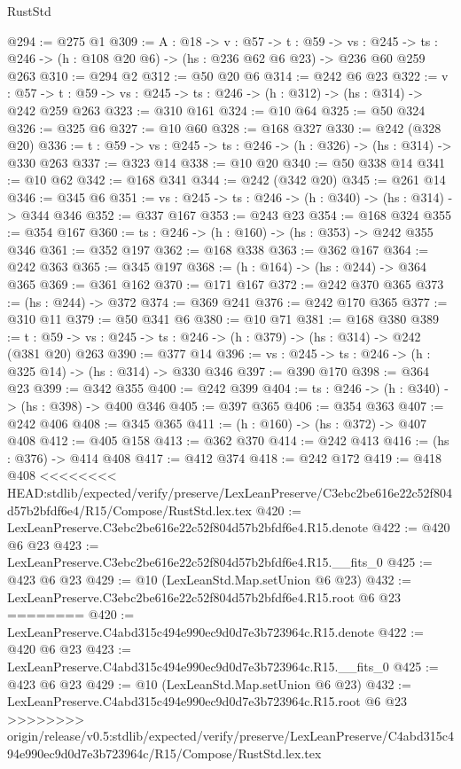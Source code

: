 \begin{lexlean}{RustStd}
\begin{coremodule}
{\begin{coremodule}
@294 := @275 @1
@309 := {A : @18} ->
  {v : @57} ->
  {t : @59} ->
  {vs : @245} -> {ts : @246} -> (h : @108 @20 @6) -> (hs : @236 @62 @6 @23) -> @236 @60 @259 @263
@310 := @294 @2
@312 := @50 @20 @6
@314 := @242 @6 @23
@322 := {v : @57} ->
  {t : @59} -> {vs : @245} -> {ts : @246} -> (h : @312) -> (hs : @314) -> @242 @259 @263
@323 := @310 @161
@324 := @10 @64
@325 := @50 @324
@326 := @325 @6
@327 := @10 @60
@328 := @168 @327
@330 := @242 (@328 @20)
@336 := {t : @59} -> {vs : @245} -> {ts : @246} -> (h : @326) -> (hs : @314) -> @330 @263
@337 := @323 @14
@338 := @10 @20
@340 := @50 @338 @14
@341 := @10 @62
@342 := @168 @341
@344 := @242 (@342 @20)
@345 := @261 @14
@346 := @345 @6
@351 := {vs : @245} -> {ts : @246} -> (h : @340) -> (hs : @314) -> @344 @346
@352 := @337 @167
@353 := @243 @23
@354 := @168 @324
@355 := @354 @167
@360 := {ts : @246} -> (h : @160) -> (hs : @353) -> @242 @355 @346
@361 := @352 @197
@362 := @168 @338
@363 := @362 @167
@364 := @242 @363
@365 := @345 @197
@368 := (h : @164) -> (hs : @244) -> @364 @365
@369 := @361 @162
@370 := @171 @167
@372 := @242 @370 @365
@373 := (hs : @244) -> @372
@374 := @369 @241
@376 := @242 @170 @365
@377 := @310 @11
@379 := @50 @341 @6
@380 := @10 @71
@381 := @168 @380
@389 := {t : @59} -> {vs : @245} -> {ts : @246} -> (h : @379) -> (hs : @314) -> @242 (@381 @20) @263
@390 := @377 @14
@396 := {vs : @245} -> {ts : @246} -> (h : @325 @14) -> (hs : @314) -> @330 @346
@397 := @390 @170
@398 := @364 @23
@399 := @342 @355
@400 := @242 @399
@404 := {ts : @246} -> (h : @340) -> (hs : @398) -> @400 @346
@405 := @397 @365
@406 := @354 @363
@407 := @242 @406
@408 := @345 @365
@411 := (h : @160) -> (hs : @372) -> @407 @408
@412 := @405 @158
@413 := @362 @370
@414 := @242 @413
@416 := (hs : @376) -> @414 @408
@417 := @412 @374
@418 := @242 @172
@419 := @418 @408
<<<<<<<< HEAD:stdlib/expected/verify/preserve/LexLeanPreserve/C3ebc2be616e22c52f804d57b2bfdf6e4/R15/Compose/RustStd.lex.tex
@420 := LexLeanPreserve.C3ebc2be616e22c52f804d57b2bfdf6e4.R15.denote
@422 := @420 @6 @23
@423 := LexLeanPreserve.C3ebc2be616e22c52f804d57b2bfdf6e4.R15.__fits_0
@425 := @423 @6 @23
@429 := @10 (LexLeanStd.Map.setUnion @6 @23)
@432 := LexLeanPreserve.C3ebc2be616e22c52f804d57b2bfdf6e4.R15.root @6 @23
========
@420 := LexLeanPreserve.C4abd315c494e990ec9d0d7e3b723964c.R15.denote
@422 := @420 @6 @23
@423 := LexLeanPreserve.C4abd315c494e990ec9d0d7e3b723964c.R15.__fits_0
@425 := @423 @6 @23
@429 := @10 (LexLeanStd.Map.setUnion @6 @23)
@432 := LexLeanPreserve.C4abd315c494e990ec9d0d7e3b723964c.R15.root @6 @23
>>>>>>>> origin/release/v0.5:stdlib/expected/verify/preserve/LexLeanPreserve/C4abd315c494e990ec9d0d7e3b723964c/R15/Compose/RustStd.lex.tex

\end{coremodule}}
\end{coremodule}
\end{lexlean}
